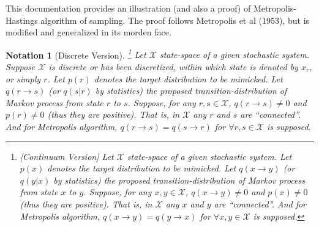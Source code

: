 \documentclass{article}
\newtheorem{notation}{Notation}
{\theorembodyfont{\rmfamily}\newtheorem{remark}{Remark}}
\begin{document}
This documentation provides an illustration (and also a proof) of
Metropolis-Hastings algorithm of sampling. The proof follows Metropolis et al
(1953), but is modified and generalized in its morden face.

\begin{notation}
  [Discrete Version]\footnote{[Continuum Version] Let $\mathcal{X}$
  state-space of a given stochastic system. Let $p ( x )$ denotes the target
  distribution to be mimicked. Let $q ( x \rightarrow y )$ (or $q ( y|x )$ by
  statistics) the proposed transition-distribution of Markov process from
  state $x$ to $y$. Suppose, for any $x,y \in \mathcal{X}$, $q ( x \rightarrow
  y ) \neq 0$ and $p ( x ) \neq 0$ (thus they are positive). That is, in
  $\mathcal{X}$ any $x$ and $y$ are ``connected''. And for Metropolis
  algorithm, $q ( x \rightarrow y ) =q ( y \rightarrow x )$ for $\forall x,y
  \in \mathcal{X}$ is supposed.} Let $\mathcal{X}$ state-space of a given
  stochastic system. Suppose $\mathcal{X}$ is discrete or has been
  discretized, within which state is denoted by $x_{r}$, or simply $r$. Let $p
  ( r )$ denotes the target distribution to be mimicked. Let $q ( r
  \rightarrow s )$ (or $q ( s|r )$ by statistics) the proposed
  transition-distribution of Markov process from state $r$ to $s$. Suppose,
  for any $r,s \in \mathcal{X}$, $q ( r \rightarrow s ) \neq 0$ and $p ( r )
  \neq 0$ (thus they are positive). That is, in $\mathcal{X}$ any $r$ and $s$
  are ``connected''. And for Metropolis algorithm, $q ( r \rightarrow s ) =q (
  s \rightarrow r )$ for $\forall r,s \in \mathcal{X}$ is supposed.
\end{notation}
\end{document}
